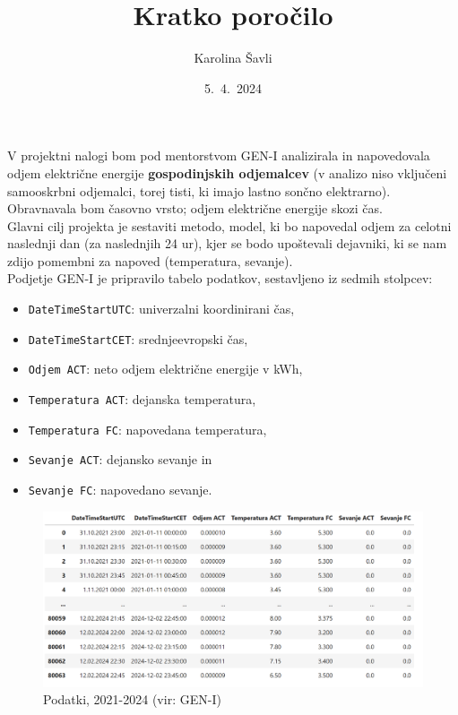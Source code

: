 \documentclass[a4paper, 10pt]{article}
\begin{document}
\title{\textbf{\LARGE{Kratko poročilo}}}
\author{Karolina Šavli}
\date{5.\ 4.\ 2024}

\maketitle


\noindent V projektni nalogi bom pod mentorstvom GEN-I analizirala in napovedovala odjem električne energije 
\textbf{gospodinjskih odjemalcev} (v analizo niso vključeni samooskrbni odjemalci, torej tisti, 
ki imajo lastno sončno elektrarno). Obravnavala bom časovno vrsto; odjem električne energije skozi čas. \\

\noindent Glavni cilj projekta je sestaviti metodo, model, ki bo napovedal odjem za celotni naslednji dan (za naslednjih 24 ur), 
kjer se bodo upoštevali dejavniki, ki se nam zdijo pomembni za napoved (temperatura, sevanje). \\

\noindent Podjetje GEN-I je pripravilo tabelo podatkov, sestavljeno iz sedmih stolpcev:
\begin{itemize}
    \item  \texttt{DateTimeStartUTC}: univerzalni koordinirani čas,
    \item  \texttt{DateTimeStartCET}: srednjeevropski čas,
    \item  \texttt{Odjem ACT}: neto odjem električne energije v kWh,
    \item  \texttt{Temperatura ACT}: dejanska temperatura, 
    \item  \texttt{Temperatura FC}: napovedana temperatura,
    \item  \texttt{Sevanje ACT}: dejansko sevanje in
    \item  \texttt{Sevanje FC}: napovedano sevanje. 
\end{itemize}

\begin{figure}[h!]
    \centering
    \caption{Podatki, 2021-2024 (vir: GEN-I)}\par\medskip
    \includegraphics[width=\textwidth]{tabela.png}
\end{figure}
\end{document}
